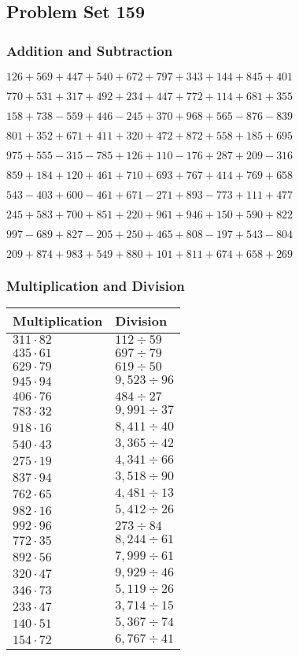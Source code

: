 \hypertarget{problem-set-159}{%
\subsection{Problem Set 159}\label{problem-set-159}}

\hypertarget{addition-and-subtraction}{%
\subsubsection{Addition and
Subtraction}\label{addition-and-subtraction}}

\(126 +569 +447 +540 +672 +797 +343 +144 +845 +401\)

\(770 +531 +317 +492 +234 +447 +772 +114 +681 +355\)

\(158 +738 - 559 +446 - 245 +370 +968 +565 - 876 - 839\)

\(801 +352 +671 +411 +320 +472 +872 +558 +185 +695\)

\(975 +555 - 315 - 785 +126 +110 - 176 +287 +209 - 316\)

\(859 +184 +120 +461 +710 +693 +767 +414 +769 +658\)

\(543 - 403 +600 - 461 +671 - 271 +893 - 773 +111 +477\)

\(245 +583 +700 +851 +220 +961 +946 +150 +590 +822\)

\(997 - 689 +827 - 205 +250 +465 +808 - 197 +543 - 804\)

\(209 +874 +983 +549 +880 +101 +811 +674 +658 +269\)

\hypertarget{multiplication-and-division}{%
\subsubsection{Multiplication and
Division}\label{multiplication-and-division}}

\begin{longtable}[]{@{}ll@{}}
\toprule
Multiplication & Division\tabularnewline
\midrule
\endhead
\(311 \cdot 82\) & \(112÷59\)\tabularnewline
\(435 \cdot 61\) & \(697÷79\)\tabularnewline
\(629 \cdot 79\) & \(619÷50\)\tabularnewline
\(945 \cdot 94\) & \(9,523÷96\)\tabularnewline
\(406 \cdot 76\) & \(484÷27\)\tabularnewline
\(783 \cdot 32\) & \(9,991÷37\)\tabularnewline
\(918 \cdot 16\) & \(8,411÷40\)\tabularnewline
\(540 \cdot 43\) & \(3,365÷42\)\tabularnewline
\(275 \cdot 19\) & \(4,341÷66\)\tabularnewline
\(837 \cdot 94\) & \(3,518÷90\)\tabularnewline
\(762 \cdot 65\) & \(4,481÷13\)\tabularnewline
\(982 \cdot 16\) & \(5,412÷26\)\tabularnewline
\(992 \cdot 96\) & \(273÷84\)\tabularnewline
\(772 \cdot 35\) & \(8,244÷61\)\tabularnewline
\(892 \cdot 56\) & \(7,999÷61\)\tabularnewline
\(320 \cdot 47\) & \(9,929÷46\)\tabularnewline
\(346 \cdot 73\) & \(5,119÷26\)\tabularnewline
\(233 \cdot 47\) & \(3,714÷15\)\tabularnewline
\(140 \cdot 51\) & \(5,367÷74\)\tabularnewline
\(154 \cdot 72\) & \(6,767÷41\)\tabularnewline
\bottomrule
\end{longtable}
